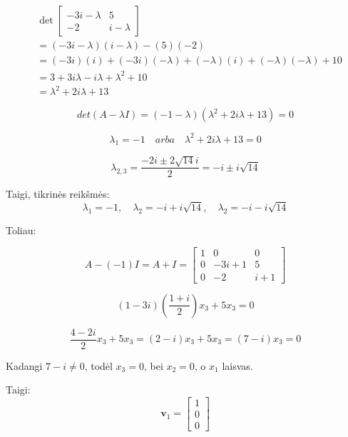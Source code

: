 \documentclass{article}
\begin{document}
\begin{align*}
&\det\begin{bmatrix}
-3i - \lambda & 5 \\
-2 & i - \lambda
\end{bmatrix} \\
&= (-3i - \lambda)(i - \lambda) - (5)(-2) \\
&= (-3i)(i) + (-3i)(-\lambda) + (-\lambda)(i) + (-\lambda)(-\lambda) + 10 \\
&= 3 + 3i\lambda - i\lambda + \lambda^2 + 10 \\
&= \lambda^2 + 2i\lambda + 13\nonumber
\end{align*}

\begin{equation}
    det(A-\lambda I) = (-1-\lambda)(\lambda^2 + 2i\lambda + 13) = 0 \nonumber
\end{equation}

\begin{equation}
    {\lambda}_1 = -1 \quad arba \quad
    \lambda^2 + 2i\lambda + 13 = 0    \nonumber
\end{equation}

\begin{equation}
    {\lambda}_{2,3} = \frac{-2i\pm 2\sqrt{14}i}{2} = -i \pm i \sqrt{14}  \nonumber
\end{equation}

Taigi, tikrinės reikšmės:
\begin{equation}
{\lambda}_1 = -1, \quad 
{\lambda}_2 = -i + i \sqrt{14}, \quad
{\lambda}_2 = -i - i \sqrt{14}\nonumber
\end{equation}



Toliau:

\begin{equation}
A-(-1)I = A + I =
\begin{bmatrix}
    1 & 0 & 0 \\
    0 & -3i + 1 & 5 \\
    0 & -2 & i + 1 \nonumber
\end{bmatrix}
\end{equation}

\[
(1 - 3i)\left(\frac{1 + i}{2}\right)x_3 + 5x_3 = 0
\]

\[
\frac{4 - 2i}{2}x_3 + 5x_3 = (2 - i)x_3 + 5x_3 = (7 - i)x_3 = 0
\]

Kadangi $7 - i \neq 0$, todėl $x_3 = 0$, bei $x_2 = 0$, o $x_1$ laisvas.

Taigi:
\[
\mathbf{v}_1 = \begin{bmatrix} 1 \\ 0 \\ 0 \end{bmatrix}
\]
\end{document}
